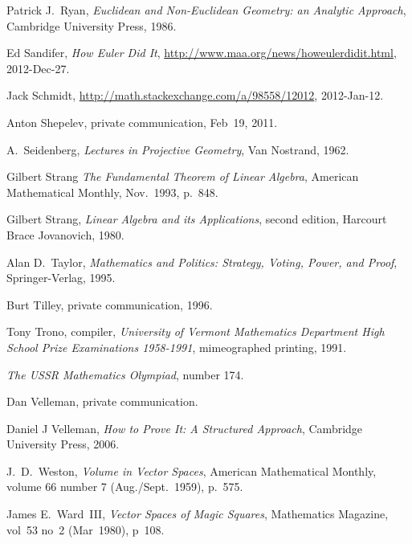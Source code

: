 \begin{thebibliography}{\makebox[2em][c]{{}\hfil{}}}
  Patrick J.~Ryan,
  \emph{Euclidean and Non-Euclidean Geometry: an Analytic Approach},
  Cambridge University Press, 1986.

  Ed Sandifer,
  \textit{How Euler Did It},
  \url{http://www.maa.org/news/howeulerdidit.html},
  2012-Dec-27.

  Jack Schmidt, %
  \url{http://math.stackexchange.com/a/98558/12012}, 
  2012-Jan-12.

  Anton Shepelev,
  private communication,
  Feb~19, 2011.

  A.~Seidenberg,
  \emph{Lectures in Projective Geometry},
  Van Nostrand, 1962.


  Gilbert Strang
  \emph{The Fundamental Theorem of Linear Algebra},
  American Mathematical Monthly,
  Nov.~1993, p.~848.

  Gilbert Strang,
  \emph{Linear Algebra and its Applications},
  second edition,
  Harcourt Brace Jovanovich,
  1980.

  Alan D.~Taylor,
  \emph{Mathematics and Politics: Strategy, Voting, Power, and Proof},
  Springer-Verlag,
  1995.

  Burt Tilley,
  private communication,
  1996.

  Tony Trono, compiler,
  \emph{University of Vermont Mathematics Department High School Prize
    Examinations 1958-1991},
  mimeographed printing, 1991.

  \emph{The USSR Mathematics Olympiad},
   number 174.

  Dan Velleman,
  private communication.

  Daniel J Velleman,
  \textit{How to Prove It: A Structured Approach},
  Cambridge University Press,
  2006.

  J.~D.\ Weston,
  \emph{Volume in Vector Spaces},
  American Mathematical Monthly,
  volume 66 number 7 (Aug./Sept.\ 1959),
  p.~575.

  James E.\ Ward~III,
  \emph{Vector Spaces of Magic Squares},
  Mathematics Magazine,
  vol~53 no~2 (Mar~1980),
  p~108.


\end{thebibliography}
